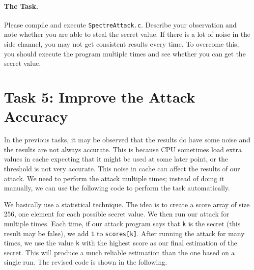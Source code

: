 \paragraph{The Task.} Please compile and execute 
\texttt{SpectreAttack.c}. Describe your observation and note whether you are able to steal the
secret value. If there is a lot of noise in the side channel, you may not get consistent results 
every time. To overcome this,
you should execute the program multiple times and see whether you can get the secret value. 




\section{Task 5: Improve the Attack Accuracy}


In the previous tasks, it may be observed that the results do have some noise and the results
are not always accurate. This is because CPU sometimes load extra values in cache expecting
that it might be used at some later point, or the threshold is not very accurate. 
This noise in cache can affect the results of our
attack. We need to perform the attack multiple times; instead of doing it manually,
we can use the following code to perform the task automatically.

We basically use a statistical technique.
The idea is to create a score array of size 256, one element for each possible
secret value. We then run our attack for multiple times. Each time, if our
attack program says that \texttt{k} is the secret (this result may be
false), we add \texttt{1} to \texttt{scores[k]}.  After running the attack for many
times, we use the value \texttt{k} with
the highest score as our final estimation of the secret.  This will produce
a much reliable estimation than the one based on a single run. The revised
code is shown in the following.




